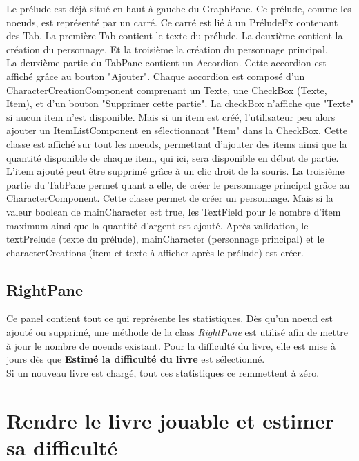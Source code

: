 		Le prélude est déjà situé en haut à gauche du GraphPane. Ce prélude, comme les noeuds, est représenté par un carré. Ce carré est lié à un PréludeFx contenant des Tab. La première Tab contient le texte du prélude. La deuxième contient la création du personnage. Et la troisième la création du personnage principal.\\
		La deuxième partie du TabPane contient un Accordion.  Cette accordion est affiché grâce au bouton "Ajouter". Chaque accordion est composé d'un CharacterCreationComponent comprenant un Texte, une CheckBox (Texte, Item), et d'un bouton "Supprimer cette partie". La checkBox n'affiche que "Texte" si aucun item n'est disponible. Mais si un item est créé, l'utilisateur peu alors ajouter un ItemListComponent en sélectionnant "Item" dans la CheckBox. Cette classe est affiché sur tout les noeuds, permettant d'ajouter des items ainsi que la quantité disponible de chaque item, qui ici, sera disponible en début de partie. L'item ajouté peut être supprimé grâce à un clic droit de la souris.
		La troisième partie du TabPane permet quant a elle, de créer le personnage principal grâce au CharacterComponent. Cette classe permet de créer un personnage. Mais si la valeur boolean de mainCharacter est true, les TextField pour le nombre d'item maximum ainsi que la quantité d'argent est ajouté.
		Après validation, le textPrelude (texte du prélude), mainCharacter (personnage principal) et le characterCreations (item et texte à afficher après le prélude) est créer.

		\subsection{RightPane}

		Ce panel contient tout ce qui représente les statistiques. Dès qu'un noeud est ajouté ou supprimé, une méthode de la class \textit{RightPane} est utilisé afin de mettre à jour le nombre de noeuds existant. Pour la difficulté du livre, elle est mise à jours dès que \textbf{Estimé la difficulté du livre} est sélectionné.\\
		Si un nouveau livre est chargé, tout ces statistiques ce remmettent à zéro.



	\section{Rendre le livre jouable et estimer sa difficulté}
